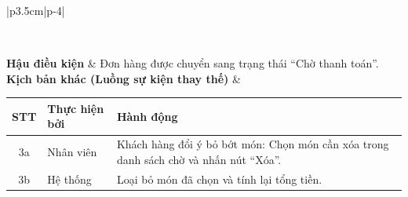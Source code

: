 \documentclass[../20232006p.tex]{subfiles}
\begin{document}
\begin{center}
\begin{longtable}{|p{3.5cm}|p{\dimexpr\textwidth-3.5cm-4\tabcolsep\relax}|}
\begin{tabular}{|c|p{2cm}|p{6.5cm}|}
            \hline
        \end{tabular}
        \vspace{0.5em}                                                                                                              \\
        \hline
        \textbf{Hậu điều kiện}                          & Đơn hàng được chuyển sang trạng thái ``Chờ thanh toán''.                  \\
        \hline
        \textbf{Kịch bản khác (Luồng sự kiện thay thế)} &
        \vspace{0.5em}
        \begin{tabular}{|c|p{2cm}|p{6.5cm}|}
            \hline
            \textbf{STT} & \textbf{Thực hiện bởi} & \textbf{Hành động}                                                                     \\
            \hline
            3a           & Nhân viên              & Khách hàng đổi ý bỏ bớt món: Chọn món cần xóa trong danh sách chờ và nhấn nút ``Xóa''. \\
            \hline
            3b           & Hệ thống               & Loại bỏ món đã chọn và tính lại tổng tiền.                                             \\
            \hline
        \end{tabular}
        \vspace{0.5em}                                                                                                              \\
        \hline
        \caption{Đặc tả chức năng Tạo đơn hàng nhanh}
        \label{tab:uc_quick_order}
    \end{longtable}
\end{center}
\hfill
\end{document}
